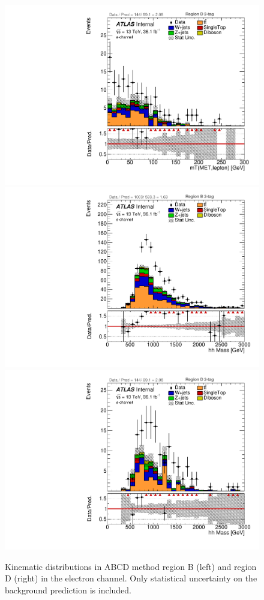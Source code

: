 \begin{figure}[!htbp]
\begin{center}
\includegraphics[scale=0.33]{./figures/boosted/ABCD_ScaledPrompt/elec_Inc_RegionD_WlepMtATLAS}\\
\includegraphics[scale=0.33]{./figures/boosted/ABCD_ScaledPrompt/elec_Inc_RegionB_hhMass}    
\includegraphics[scale=0.33]{./figures/boosted/ABCD_ScaledPrompt/elec_Inc_RegionD_hhMass}  
\caption{Kinematic distributions in ABCD method region B (left) and region D (right) in the electron channel.
Only statistical uncertainty on the background prediction is included.}
\label{fig:boosted_abcd_scaledprompt_region_bd_elec}
\end{center}
\end{figure}

